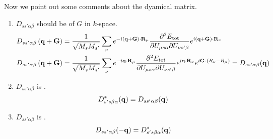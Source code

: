 Now we point out some comments about the dyamical matrix. 
\begin{enumerate}[label=\arabic *.]
    \item $D_{ss'\alpha\beta}$ should be  of $G$ in $k$-space. 
    \begin{align}
        D_{ss'\alpha\beta}\left(\mathbf{q}+\mathbf{G}\right) &= \frac{1}{\sqrt{M_sM_{s'}}}\sum_\nu e^{-i(\mathbf{q}+\mathbf{G})\cdot\mathbf{R}_\mu} \frac{\partial^2E_\text{tot}}{\partial U_{\mu s\alpha}\partial U_{\nu s'\beta}}e^{i(\mathbf{q}+\mathbf{G})\cdot\mathbf{R}_\nu} \notag\\
        D_{ss'\alpha\beta}\left(\mathbf{q}+\mathbf{G}\right) &= \frac{1}{\sqrt{M_sM_{s'}}}\sum_\nu e^{-i\mathbf{q} \cdot\mathbf{R}_\mu} \frac{\partial^2E_\text{tot}}{\partial U_{\mu s\alpha}\partial U_{\nu s'\beta}} e^{i\mathbf{q} \cdot\mathbf{R}_\nu} e^{i\mathbf{G}\cdot(R_\nu-R_\mu)} = D_{ss'\alpha\beta}(\mathbf{q}) \label{eq:esii01_dynamat_tinvar}
    \end{align}
    \item $D_{ss'\alpha\beta}$ is . 
    \begin{align}
        D^*_{s's\beta\alpha}(\mathbf{q}) &= D_{ss'\alpha\beta}(\mathbf{q}) \label{eq:esii01_dynamat_hermitian}
    \end{align}
    \item $D_{ss'\alpha\beta}$ is .
    \begin{align}
        D_{ss'\alpha\beta}(-\mathbf{q}) &= D^*_{s's\beta\alpha}(\mathbf{q})
    \end{align}
\end{enumerate}

